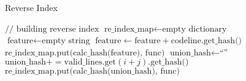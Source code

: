 \begin{algorithm}
\caption{Reverse Index}
\label{alg:reverseindex}
\begin{algorithmic}[1]
    \State $\text{// building reverse index}$
    \State $\text{re\_index\_map} \gets \text{empty dictionary}  $
        \State $\text{feature} \gets \text{empty string}$
            \State $\text{feature} \gets \text{feature} + \text{codeline.get\_hash()}$
        \EndFor
        \State $\text{re\_index\_map.put}\text{(calc\_hash(feature), func)}$
    \Else
            \State $\text{union\_hash} \gets \text{``''}$
                \State $\text{union\_hash} \mathrel{{+}{=}} \text{valid\_lines.get}(i+j).\text{get\_hash()}$
            \EndFor
            \State $\text{re\_index\_map.put(calc\_hash(union\_hash), func)}$
        \EndFor
    \EndIf
    
\EndFunction
\end{algorithmic}
\end{algorithm}







